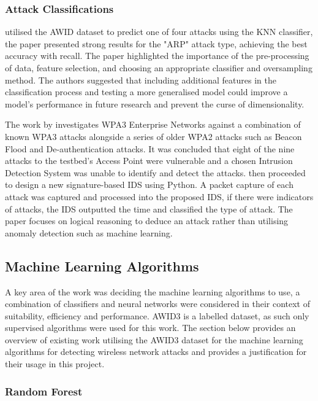 \subsubsection*{Attack Classifications}

\textcite{10.1007/978-3-030-98457-1_1} utilised the AWID dataset to predict one of four attacks using the KNN classifier, the paper presented strong results for the "ARP" attack type, achieving the best accuracy with recall. The paper highlighted the importance of the pre-processing of data, feature selection, and choosing an appropriate classifier and oversampling method. The authors suggested that including additional features in the classification process and testing a more generalised model could improve a model's performance in future research and prevent the curse of dimensionality.

\medskip
The work by \textcite{DBLP:journals/corr/abs-2110-04259} investigates WPA3 Enterprise Networks against a combination of known WPA3 attacks alongside a series of older WPA2 attacks such as Beacon Flood and De-authentication attacks. It was concluded that eight of the nine attacks to the testbed's Access Point were vulnerable and a chosen Intrusion Detection System was unable to identify and detect the attacks. \textcite{DBLP:journals/corr/abs-2110-04259} then proceeded to design a new signature-based IDS using Python. A packet capture of each attack was captured and processed into the proposed IDS, if there were indicators of attacks, the IDS outputted the time and classified the type of attack. The paper focuses on logical reasoning to deduce an attack rather than utilising anomaly detection such as machine learning.
 
\subsection{Machine Learning Algorithms}

A key area of the work was deciding the machine learning algorithms to use, a combination of classifiers and neural networks were considered in their context of suitability, efficiency and performance. AWID3 is a labelled dataset, as such only supervised algorithms were used for this work. The section below provides an overview of existing work utilising the AWID3 dataset for the machine learning algorithms for detecting wireless network attacks and provides a justification for their usage in this project.

\subsubsection{Random Forest}

